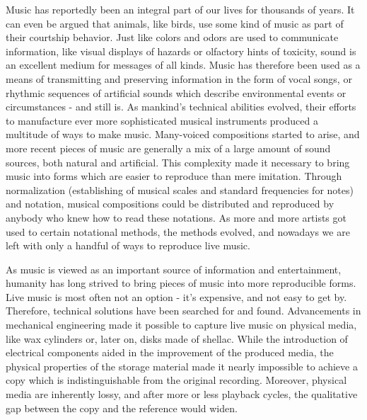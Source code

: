 Music has reportedly been an integral part of our lives for thousands of years. It can even be argued that animals, like birds, use some kind of music as part of their courtship behavior. Just like colors and odors are used to communicate information, like visual displays of hazards or olfactory hints of toxicity, sound is an excellent medium for messages of all kinds. Music has therefore been used as a means of transmitting and preserving information in the form of vocal songs, or rhythmic sequences of artificial sounds which describe environmental events or circumstances - and still is. As mankind's technical abilities evolved, their efforts to manufacture ever more sophisticated musical instruments produced a multitude of ways to make music. Many-voiced compositions started to arise, and more recent pieces of music are generally a mix of a large amount of sound sources, both natural and artificial. This complexity made it necessary to bring music into forms which are easier to reproduce than mere imitation. Through normalization (establishing of musical scales and standard frequencies for notes) and notation, musical compositions could be distributed and reproduced by anybody who knew how to read these notations. As more and more artists got used to certain notational methods, the methods evolved, and nowadays we are left with only a handful of ways to reproduce live music.

As music is viewed as an important source of information and entertainment, humanity has long strived to bring pieces of music into more reproducible forms. Live music is most often not an option - it's expensive, and not easy to get by. Therefore, technical solutions have been searched for and found. Advancements in mechanical engineering made it possible to capture live music on physical media, like wax cylinders or, later on, disks made of shellac. While the introduction of electrical components aided in the improvement of the produced media, the physical properties of the storage material made it nearly impossible to achieve a copy which is indistinguishable from the original recording. Moreover, physical media are inherently lossy, and after more or less playback cycles, the qualitative gap between the copy and the reference would widen.

